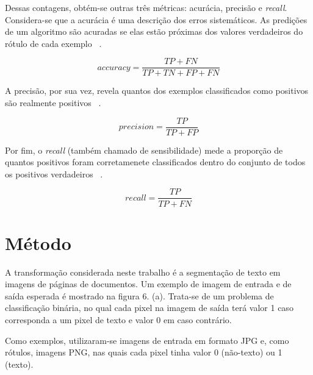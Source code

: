 \documentclass{article}
\begin{document}
		Dessas contagens, obtém-se outras três métricas: acurácia, precisão e \textit{recall}. Considera-se que a acurácia é uma descrição dos erros sistemáticos. As predições de um algoritmo são acuradas se elas estão próximas dos valores verdadeiros do rótulo de cada exemplo ~\cite{wiki:acc}.
		
		\begin{equation}
			accuracy = \frac{TP+FN}{TP+TN+FP+FN}
			\nonumber
		\end{equation}
		
		A precisão, por sua vez, revela quantos dos exemplos classificados como positivos são realmente positivos ~\cite{wiki:pre}. 
		
		\begin{equation}
			precision = \frac{TP}{TP+FP}
		\nonumber
		\end{equation}
		
		Por fim, o \textit{recall} (também chamado de sensibilidade) mede a proporção de quantos positivos foram corretamenete classificados dentro do conjunto de todos os positivos verdadeiros ~\cite{wiki:pre}. 
		
		\begin{equation}
			recall = \frac{TP}{TP+FN}
		\nonumber
		\end{equation}	
	
	\section{Método}
	
		A transformação considerada neste trabalho é a segmentação de
		texto em imagens de páginas de documentos. Um exemplo de
		imagem de entrada e de saída esperada é mostrado na figura 6. (a). Trata-se de um problema de classificação binária, no qual cada pixel na imagem de saída terá valor 1 caso corresponda a um pixel de texto e valor 0 em caso contrário.
	
		Como exemplos, utilizaram-se imagens de entrada em formato JPG e, como rótulos, imagens PNG, nas quais cada pixel tinha valor 0 (não-texto) ou 1 (texto). 
		
\end{document}
